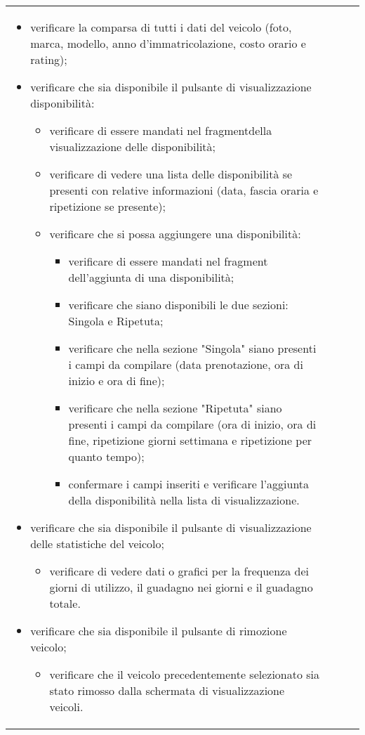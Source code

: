 \begin{longtable}{ >{\centering}p{} >{\centering}p{} >{\centering}p{}
			>{\centering}p{}}
\begin{itemize}
		 	\item verificare la comparsa di tutti i dati del veicolo (foto, marca, modello, anno d'immatricolazione, costo orario e rating);
		 	\item verificare che sia disponibile il pulsante di visualizzazione disponibilità:
		 	\begin{itemize}
		 		\item verificare di essere mandati nel fragment\glosp della visualizzazione delle disponibilità;
		 		\item verificare di vedere una lista delle disponibilità se presenti con relative informazioni (data, fascia oraria e ripetizione se presente);
		 		\item verificare che si possa aggiungere una disponibilità:
		 		\begin{itemize}
		 			\item verificare di essere mandati nel fragment dell'aggiunta di una disponibilità;
		 			\item verificare che siano disponibili le due sezioni: Singola e Ripetuta;
		 			\item verificare che nella sezione "Singola" siano presenti i campi da compilare (data prenotazione, ora di inizio e ora di fine);
		 			\item verificare che nella sezione "Ripetuta" siano presenti i campi da compilare (ora di inizio, ora di fine, ripetizione giorni settimana e ripetizione per quanto tempo);
		 			\item confermare i campi inseriti e verificare l'aggiunta della disponibilità nella lista di visualizzazione.
		 		\end{itemize}
		 	\end{itemize}
	 		\item verificare che sia disponibile il pulsante di visualizzazione delle statistiche del veicolo;
	 		\begin{itemize}
	 			\item verificare di vedere dati o grafici per la frequenza dei giorni di utilizzo, il guadagno nei giorni e il guadagno totale.
	 		\end{itemize}
		 	\item verificare che sia disponibile il pulsante di rimozione veicolo;
		 	\begin{itemize}
		 		\item verificare che il veicolo precedentemente selezionato sia stato rimosso dalla schermata di visualizzazione veicoli.
		 	\end{itemize}

\end{itemize}
\end{longtable}
